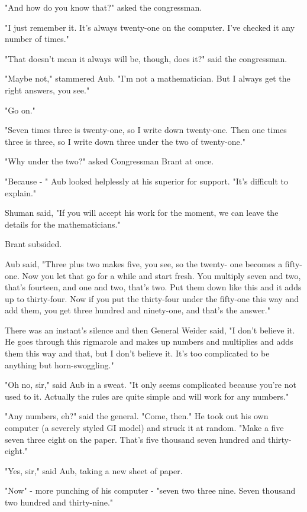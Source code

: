 \documentclass{amsart}
\begin{document}
"And how do you know that?" asked the congressman.

"I just remember it. It's always twenty-one on the computer. I've
checked it any number of times."

"That doesn't mean it always will be, though, does it?" said the
congressman.

"Maybe not," stammered Aub. "I'm not a mathematician. But I always get
the right answers, you see."

"Go on."

"Seven times three is twenty-one, so I write down twenty-one. Then one
times three is three, so I write down three under the two of
twenty-one."

"Why under the two?" asked Congressman Brant at once.

"Because - " Aub looked helplessly at his superior for support. "It's
difficult to explain."

Shuman said, "If you will accept his work for the moment, we can leave
the details for the mathematicians."

Brant subsided.

Aub said, "Three plus two makes five, you see, so the twenty- one
becomes a fifty-one. Now you let that go for a while and start fresh.
You multiply seven and two, that's fourteen, and one and two, that's
two. Put them down like this and it adds up to thirty-four. Now if you
put the thirty-four under the fifty-one this way and add them, you get
three hundred and ninety-one, and that's the answer."

There was an instant's silence and then General Weider said, "I don't
believe it. He goes through this rigmarole and makes up numbers and
multiplies and adds them this way and that, but I don't believe it.
It's too complicated to be anything but horn-swoggling."

"Oh no, sir," said Aub in a sweat. "It only seems complicated because
you're not used to it. Actually the rules are quite simple and will
work for any numbers."

"Any numbers, eh?" said the general. "Come, then." He took out his own
computer (a severely styled GI model) and struck it at random. "Make a
five seven three eight on the paper. That's five thousand seven
hundred and thirty-eight."

"Yes, sir," said Aub, taking a new sheet of paper.

"Now" - more punching of his computer - "seven two three nine. Seven
thousand two hundred and thirty-nine."
\end{document}
